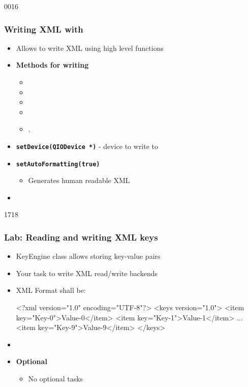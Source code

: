 \begin{slide}{0016}\frametitle{Writing XML with }
\begin{itemize}
\item Allows to write XML using high level functions
\item \textbf{Methods for writing}
  \begin{itemize}
  \item {}
  \item {}
  \item {}
  \item {}
  \item {}.
  \end{itemize}
\item \textbf{\texttt{setDevice(QIODevice *)}} - device to write to
\item  \textbf{\texttt{setAutoFormatting(true)}}
  \begin{itemize}
  \item Generates human readable XML
  \end{itemize}
\item {} 
\end{itemize}
\end{slide}


\begin{slide}[fragile]{1718}\frametitle{Lab: Reading and writing XML keys}
  \begin{itemize}
  \item KeyEngine class allows storing key-value pairs
  \item Your task to write XML read/write backends
  \item XML Format shall be:
    \begin{xml}
<?xml version="1.0" encoding="UTF-8"?>
<keys version="1.0">
  <item key="Key-0">Value-0</item>
  <item key="Key-1">Value-1</item>
  ...
  <item key="Key-9">Value-9</item>
</keys>      
    \end{xml}
  \item {}
  \item \textbf{Optional}
    \begin{itemize}
  \item No optional tasks
    \end{itemize}
\end{itemize}

\end{slide}





